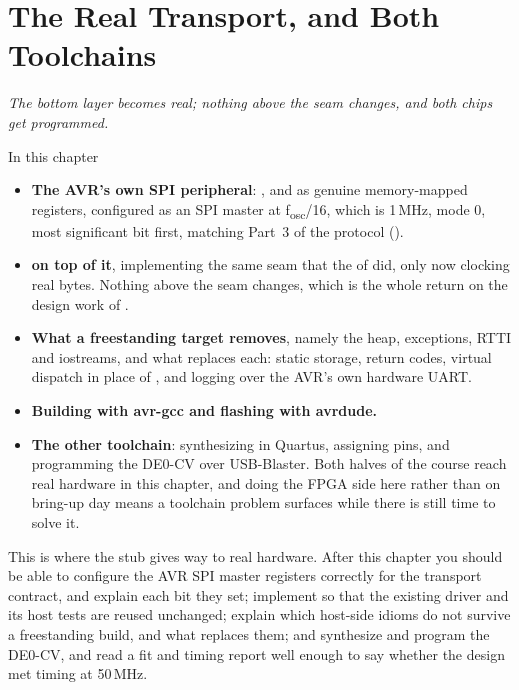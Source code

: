 
\chapter{The Real Transport, and Both Toolchains}
\label{c9:ch}

{\large\itshape The bottom layer becomes real; nothing above the seam changes, and both chips get
programmed.\par}

\begin{chapterbox}{In this chapter}
\begin{itemize}
  \item \textbf{The AVR's own SPI peripheral}: ,  and  as genuine
    memory-mapped  registers, configured as an SPI master at
    f\textsubscript{osc}/16, which is 1\,MHz, mode 0, most significant bit first, matching Part~3 of
    the protocol ().
  \item \textbf{ on top of it}, implementing the same 
    seam that the  of  did, only now clocking real bytes.
    Nothing above the seam changes, which is the whole return on the design work of .
  \item \textbf{What a freestanding target removes}, namely the heap, exceptions, RTTI and
    iostreams, and what replaces each: static storage, return codes, virtual dispatch in place of
    , and logging over the AVR's own hardware UART.
  \item \textbf{Building with avr-gcc and flashing with avrdude.}
  \item \textbf{The other toolchain}: synthesizing  in Quartus, assigning pins,
    and programming the DE0-CV over USB-Blaster. Both halves of the course reach real hardware in
    this chapter, and doing the FPGA side here rather than on bring-up day means a toolchain problem
    surfaces while there is still time to solve it.
\end{itemize}
\end{chapterbox}

This is where the stub gives way to real hardware. After this chapter you should be able to
configure the AVR SPI master registers correctly for the transport contract, and explain each bit
they set; implement  so that the existing driver and its host tests are reused
unchanged; explain which host-side idioms do not survive a freestanding build, and what replaces
them; and synthesize and program the DE0-CV, and read a fit and timing report well enough to say
whether the design met timing at 50\,MHz.

